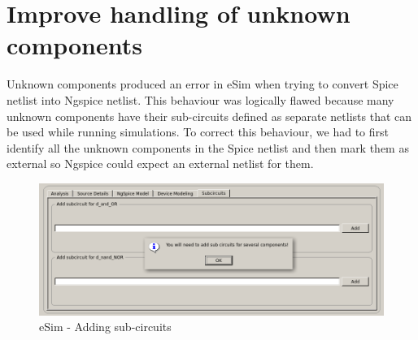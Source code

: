 \documentclass[12pt,a4paper]{report}
\begin{document}
\section{Improve handling of unknown components}
Unknown components produced an error in eSim when trying to convert Spice netlist into Ngspice netlist. This behaviour was logically flawed because many unknown components have their sub-circuits defined as separate netlists that can be used while running simulations. To correct this behaviour, we had to first identify all the unknown components in the Spice netlist and then mark them as external so Ngspice could expect an external netlist for them.\\
\begin{figure}[h]
 	\centering
 	\includegraphics[width=\textwidth]{eSim7}
 	\caption{eSim - Adding sub-circuits}
\end{figure} 
\\
\end{document}
